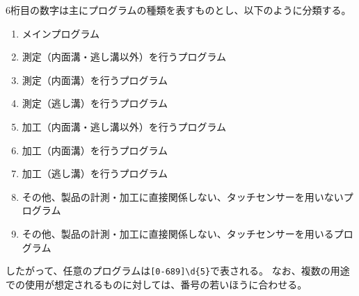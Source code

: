 6桁目の数字は主にプログラムの種類を表すものとし、以下のように分類する。
\begin{enumerate}[label=\arabic*., ref=\arabic*, start=0]
\item\label{item:6main} メインプログラム
\item\label{item:6Mmain} 測定（内面溝・逃し溝以外）を行うプログラム
\item\label{item:6MD} 測定（内面溝）を行うプログラム
\item\label{item:6MN} 測定（逃し溝）を行うプログラム
\item\label{item:6Kmain} 加工（内面溝・逃し溝以外）を行うプログラム
\item\label{item:6KD} 加工（内面溝）を行うプログラム
\item\label{item:6KN} 加工（逃し溝）を行うプログラム
\setcounter{enumi}{7}
\item\label{item:6o} その他、製品の計測・加工に直接関係しない、タッチセンサーを用いないプログラム
\item\label{item:6oM} その他、製品の計測・加工に直接関係しない、タッチセンサーを用いるプログラム
\end{enumerate}
したがって、任意のプログラムは\verb|[0-689]\d{5}|で表される。
なお、複数の用途での使用が想定されるものに対しては、番号の若いほうに合わせる。


